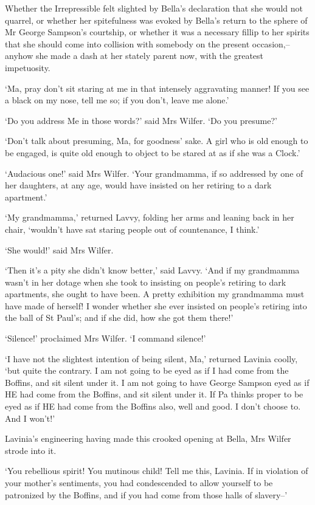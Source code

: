 Whether the Irrepressible felt slighted by Bella’s declaration that she
would not quarrel, or whether her spitefulness was evoked by Bella’s
return to the sphere of Mr George Sampson’s courtship, or whether it was
a necessary fillip to her spirits that she should come into collision
with somebody on the present occasion,--anyhow she made a dash at her
stately parent now, with the greatest impetuosity.

‘Ma, pray don’t sit staring at me in that intensely aggravating manner!
If you see a black on my nose, tell me so; if you don’t, leave me
alone.’

‘Do you address Me in those words?’ said Mrs Wilfer. ‘Do you presume?’

‘Don’t talk about presuming, Ma, for goodness’ sake. A girl who is old
enough to be engaged, is quite old enough to object to be stared at as
if she was a Clock.’

‘Audacious one!’ said Mrs Wilfer. ‘Your grandmamma, if so addressed by
one of her daughters, at any age, would have insisted on her retiring to
a dark apartment.’

‘My grandmamma,’ returned Lavvy, folding her arms and leaning back
in her chair, ‘wouldn’t have sat staring people out of countenance, I
think.’

‘She would!’ said Mrs Wilfer.

‘Then it’s a pity she didn’t know better,’ said Lavvy. ‘And if my
grandmamma wasn’t in her dotage when she took to insisting on people’s
retiring to dark apartments, she ought to have been. A pretty exhibition
my grandmamma must have made of herself! I wonder whether she ever
insisted on people’s retiring into the ball of St Paul’s; and if she
did, how she got them there!’

‘Silence!’ proclaimed Mrs Wilfer. ‘I command silence!’

‘I have not the slightest intention of being silent, Ma,’ returned
Lavinia coolly, ‘but quite the contrary. I am not going to be eyed as if
I had come from the Boffins, and sit silent under it. I am not going
to have George Sampson eyed as if HE had come from the Boffins, and sit
silent under it. If Pa thinks proper to be eyed as if HE had come from
the Boffins also, well and good. I don’t choose to. And I won’t!’

Lavinia’s engineering having made this crooked opening at Bella, Mrs
Wilfer strode into it.

‘You rebellious spirit! You mutinous child! Tell me this, Lavinia. If
in violation of your mother’s sentiments, you had condescended to allow
yourself to be patronized by the Boffins, and if you had come from those
halls of slavery--’

